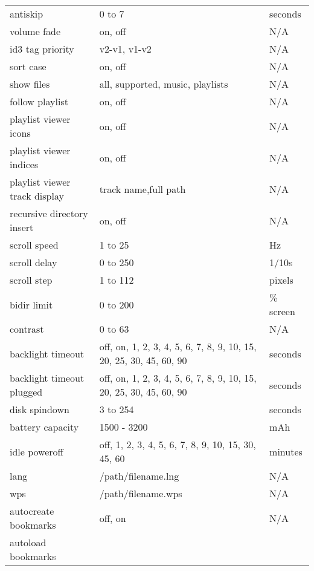 \begin{center}
\begin{longtable}{@{}>{\raggedright}p{}@{}>{\raggedright}p{}@{}p{}@{}}
    antiskip        & 0 to 7            & seconds\\
    volume fade     & on, off           & N/A\\
    id3 tag priority & v2-v1, v1-v2     & N/A\\
    sort case       & on, off           & N/A\\
    show files  & all, supported, music, playlists
                                        & N/A\\
    follow playlist & on, off           & N/A\\
    playlist viewer icons
                    & on, off           & N/A\\
    playlist viewer indices
                    & on, off           & N/A\\
    playlist viewer track display
                    & track name,full path
                                        & N/A\\
    recursive directory insert
                    & on, off           & N/A\\
    scroll speed    & 1 to 25           & Hz\\
    scroll delay    & 0 to 250          & 1/10s\\
    scroll step     & 1 to 112          & pixels\\
    bidir limit     & 0 to 200          & \% screen\\
    contrast        & 0 to 63           & N/A\\
    backlight timeout
                    & off, on, 1, 2, 3, 4, 5, 6, 7, 8, 9, 10, 15, 20, 25, 30,
                      45, 60, 90        & seconds\\
    backlight timeout plugged
                    & off, on, 1, 2, 3, 4, 5, 6, 7, 8, 9, 10, 15, 20, 25, 30,
                      45, 60, 90        & seconds\\
    disk spindown   & 3 to 254          & seconds\\
    battery capacity
                    & 1500 - 3200      & mAh\\
    idle poweroff   & off, 1, 2, 3, 4, 5, 6, 7, 8, 9, 10, 15, 30, 45, 60
                                        & minutes\\
    lang            & /path/filename.lng & N/A\\
    wps             & /path/filename.wps & N/A\\
    autocreate bookmarks
                    & off, on           & N/A\\
    autoload bookmarks

\end{longtable}
\end{center}
